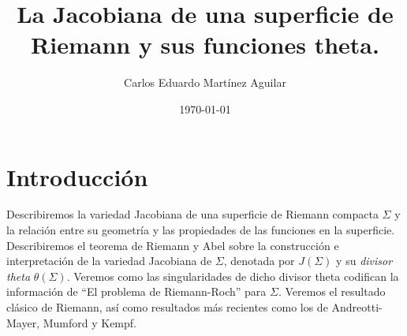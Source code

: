 \documentclass[letterpaper]{article}
\author{Carlos Eduardo Martínez Aguilar}
\date{\today}
\title{La Jacobiana de una superficie de Riemann y sus funciones theta.}
\newcommand{\sig}{\ensuremath{\Sigma}}
\begin{document}
\maketitle
\tableofcontents


\section{Introducción}
\noindent Describiremos la variedad Jacobiana de una superficie de Riemann compacta \(\sig\) y la relación entre su geometría y las propiedades de las funciones en la superficie. Describiremos el teorema de Riemann y Abel sobre la construcción e interpretación de la variedad Jacobiana de \(\sig\), denotada por \(J(\sig)\) y su \emph{divisor theta} \(\theta(\sig)\). Veremos como las singularidades de dicho divisor theta codifican la información de ``El problema de Riemann-Roch'' para \(\sig\). Veremos el resultado clásico de Riemann, así como resultados más recientes como los de Andreotti-Mayer, Mumford y Kempf.
\end{document}
